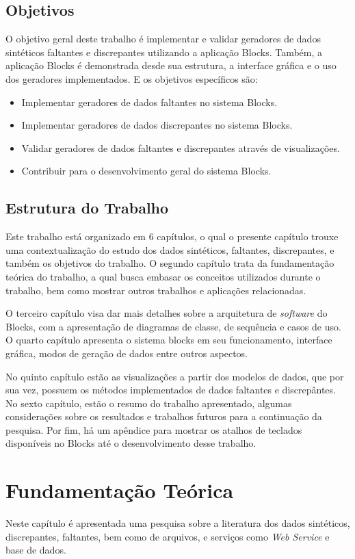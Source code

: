 \documentclass[
	12pt,				%
	openright,			%
	oneside,			%
	a4paper,			%
	english,			%
	brazil				%
	]{abntex2}
\begin{document}
	\section{Objetivos}
		O objetivo geral deste trabalho é implementar e validar geradores de dados sintéticos faltantes e discrepantes utilizando a aplicação Blocks.
		Também, a aplicação Blocks é demonstrada desde sua estrutura, a interface gráfica e o uso dos geradores implementados.			
		E os objetivos específicos são:
		\begin{itemize}
			\item Implementar geradores de dados faltantes no sistema Blocks.
			\item Implementar geradores de dados discrepantes no sistema Blocks.
			\item Validar geradores de dados faltantes e discrepantes através de visualizações.
			\item Contribuir para o desenvolvimento geral do sistema Blocks.
		\end{itemize}
	\section{Estrutura do Trabalho}
		Este trabalho está organizado em 6 capítulos, o qual o presente capítulo trouxe uma contextualização do estudo dos dados sintéticos, faltantes, discrepantes, e também os objetivos do trabalho.
		O segundo capítulo trata da fundamentação teórica do trabalho, a qual busca embasar os conceitos utilizados durante o trabalho, bem como mostrar outros trabalhos e aplicações relacionadas.
		\par
		O terceiro capítulo visa dar mais detalhes sobre a arquitetura de \emph{software} do Blocks, com a apresentação de diagramas de classe, de sequência e casos de uso.
		O quarto capítulo apresenta o sistema blocks em seu funcionamento, interface gráfica, modos de geração de dados entre outros aspectos.
		\par
		No quinto capítulo estão as visualizações a partir dos modelos de dados, que por sua vez, possuem os métodos implementados de dados faltantes e discrepântes.
		No sexto capítulo, estão o resumo do trabalho apresentado, algumas considerações sobre os resultados e trabalhos futuros para a continuação da pesquisa. 
		Por fim, há um apêndice para mostrar os atalhos de teclados disponíveis no Blocks até o desenvolvimento desse trabalho.

\chapter{Fundamentação Teórica}
	Neste capítulo é apresentada uma pesquisa sobre a literatura dos dados sintéticos, discrepantes, faltantes,
	 bem como de arquivos, e serviços como \emph{Web Service} e base de dados.
\end{document}
